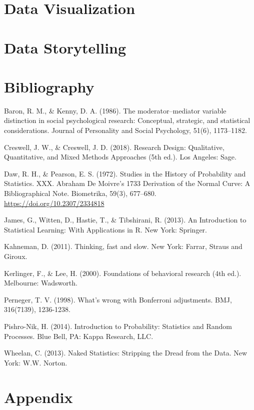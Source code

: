 \documentclass[]{book}
\begin{document}
\hypertarget{data-visualization}{%
\chapter{Data Visualization}\label{data-visualization}}

\hypertarget{data-storytelling}{%
\chapter{Data Storytelling}\label{data-storytelling}}

\hypertarget{bibliography}{%
\chapter{Bibliography}\label{bibliography}}

Baron, R. M., \& Kenny, D. A. (1986). The moderator--mediator variable distinction in social psychological research: Conceptual, strategic, and statistical considerations. Journal of Personality and Social Psychology, 51(6), 1173--1182.

Creswell, J. W., \& Creswell, J. D. (2018). Research Design: Qualitative, Quantitative, and Mixed Methods Approaches (5th ed.). Los Angeles: Sage.

Daw, R. H., \& Pearson, E. S. (1972). Studies in the History of Probability and Statistics. XXX. Abraham De Moivre's 1733 Derivation of the Normal Curve: A Bibliographical Note. Biometrika, 59(3), 677--680. \url{https://doi.org/10.2307/2334818}

James, G., Witten, D., Hastie, T., \& Tibshirani, R. (2013). An Introduction to Statistical Learning: With Applications in R. New York: Springer.

Kahneman, D. (2011). Thinking, fast and slow. New York: Farrar, Straus and Giroux.

Kerlinger, F., \& Lee, H. (2000). Foundations of behavioral research (4th ed.). Melbourne: Wadsworth.

Perneger, T. V. (1998). What's wrong with Bonferroni adjustments. BMJ, 316(7139), 1236-1238.

Pishro-Nik, H. (2014). Introduction to Probability: Statistics and Random Processes. Blue Bell, PA: Kappa Research, LLC.

Wheelan, C. (2013). Naked Statistics: Stripping the Dread from the Data. New York: W.W. Norton.

\hypertarget{appendix}{%
\chapter{Appendix}\label{appendix}}
\end{document}
